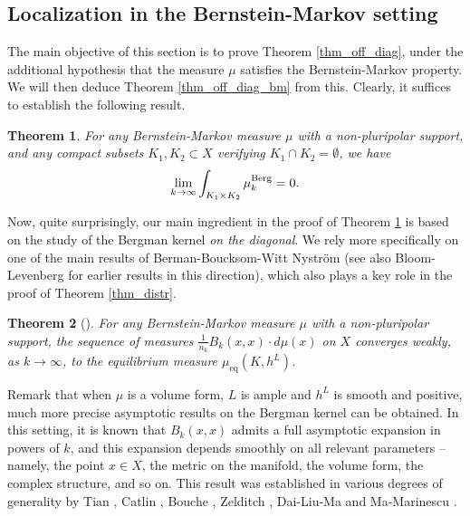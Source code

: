 \documentclass[12pt]{article}
\numberwithin{equation}{section}
\theoremstyle{theorem}
\newtheorem{thm}{Theorem}[section]
\theoremstyle{definition}
\theoremstyle{remark}
\begin{document}
	\subsection{Localization in the Bernstein-Markov setting}\label{sect_off_diag}
	The main objective of this section is to prove Theorem \ref{thm_off_diag}, under the additional hypothesis that the measure $\mu$ satisfies the Bernstein-Markov property. We will then deduce Theorem \ref{thm_off_diag_bm} from this.
	Clearly, it suffices to establish the following result.
	\begin{thm}\label{thm_nomass}
		For any Bernstein-Markov measure $\mu$ with a non-pluripolar support, and any compact subsets $K_1, K_2 \subset X$ verifying $K_1 \cap K_2 = \emptyset$, we have
		\begin{equation}
			\lim_{k \to \infty} \int_{K_1 \times K_2} \mu_k^{\rm{Berg}} = 0.
 		\end{equation}
	\end{thm}
	\par 
	Now, quite surprisingly, our main ingredient in the proof of Theorem \ref{thm_nomass} is based on the study of the Bergman kernel \textit{on the diagonal}.
	We rely more specifically on one of the main results of Berman-Boucksom-Witt Nyström \cite{BerBoucNys} (see also Bloom-Levenberg \cite{BloomLeven1,BloomLeven2} for earlier results in this direction), which also plays a key role in the proof of Theorem \ref{thm_distr}.
	\begin{thm}[{\cite[Theorem B]{BerBoucNys}}]\label{thm_diag}
		For any Bernstein-Markov measure $\mu$ with a non-pluripolar support, the sequence of measures $\frac{1}{n_k} B_k(x, x) \cdot d \mu(x)$ on $X$ converges weakly, as $k \to \infty$, to the equilibrium measure $\mu_{\mathrm{eq}}(K, h^L)$.
	\end{thm}
	\par 
	Remark that when $\mu$ is a volume form, $L$ is ample and $h^L$ is smooth and positive, much more precise asymptotic results on the Bergman kernel can be obtained.  
	In this setting, it is known that $B_k(x, x)$ admits a full asymptotic expansion in powers of $k$, and this expansion depends smoothly on all relevant parameters -- namely, the point $x \in X$, the metric on the manifold, the volume form, the complex structure, and so on.  
	This result was established in various degrees of generality by Tian \cite{TianBerg}, Catlin \cite{Caltin}, Bouche \cite{Bouche}, Zelditch \cite{ZeldBerg}, Dai-Liu-Ma \cite{DaiLiuMa} and Ma-Marinescu \cite{MaHol}.
	\par 
\end{document}
